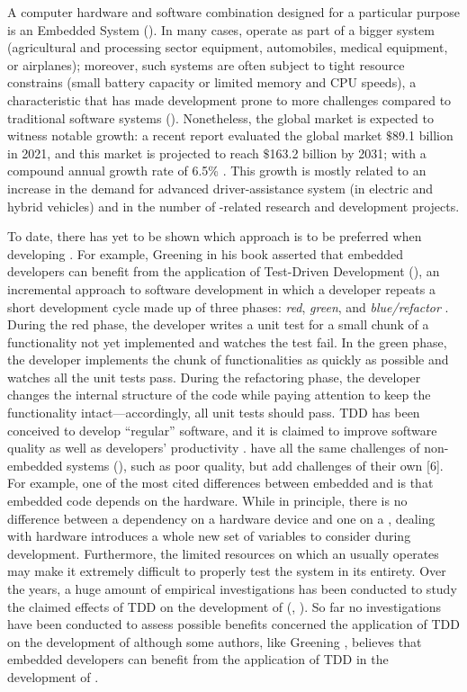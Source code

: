 A computer hardware and software combination designed for a particular purpose is an Embedded System (\es). In many cases, \ess operate as part of a bigger system (\eg  agricultural and processing sector equipment, automobiles, medical equipment, or airplanes); moreover, such systems are often subject to tight resource constrains (\eg small battery capacity or limited memory and CPU speeds), a characteristic that has made \es development prone to more challenges compared to traditional software systems (\noess).
Nonetheless, the global \ess market is expected to witness notable growth: a recent report evaluated the global \ess market $\$$89.1 billion in 2021, and this market is projected to reach $\$$163.2 billion by 2031; with a compound annual growth rate of 6.5\% \cite{ESSTR2022}. This growth is mostly related to an increase in the demand for advanced driver-assistance system (in electric and hybrid vehicles) and in the number of \ess-related research and development projects.  

To date, there has yet to be shown which approach is to be preferred when developing \ess. For example, Greening \cite{TDDEC} in his book asserted that embedded developers can benefit from the application of
Test-Driven Development (\tdd), an incremental approach to software development in which a developer repeats a short development cycle made up of three phases: \textit{red}, \textit{green}, and \textit{blue/refactor} \cite{TDDByExample}. During the red phase, the developer writes a unit test for a small chunk of a functionality not yet implemented and watches the test fail. In the green phase, the developer implements the chunk of functionalities as quickly as possible and watches all the unit tests pass. During the refactoring phase, the developer changes the internal structure of the code while paying attention to keep the functionality intact—accordingly, all unit tests should pass. TDD has been conceived to develop “regular” software, and it is claimed to improve software quality as well as developers' productivity \cite{DBLP:reference/se/ErdogmusMJ10}. \ess have all the same challenges of non-embedded systems (\noess), such as poor quality, but add challenges of their own [6]. 
For example, one of the most cited differences between embedded and \noess is that embedded code depends on the hardware. While in principle, there is no difference between a dependency on a hardware device and one on a \noess \cite{TDDEC}, dealing with hardware introduces a whole new set of variables to consider during development. Furthermore, the limited resources on which an \es usually operates may make it extremely difficult to properly test the system in its entirety. 
Over the years, a huge amount of empirical investigations has been conducted to study the claimed effects of TDD on the development of \noess (\eg, \cite{DBLP:journals/software/KaracT18}). So far no investigations have been conducted to assess possible benefits concerned the application of TDD on the development of \ess although some authors, like Greening \cite{TDDEC}, believes that embedded developers can benefit from the application of TDD in the development of \ess.

